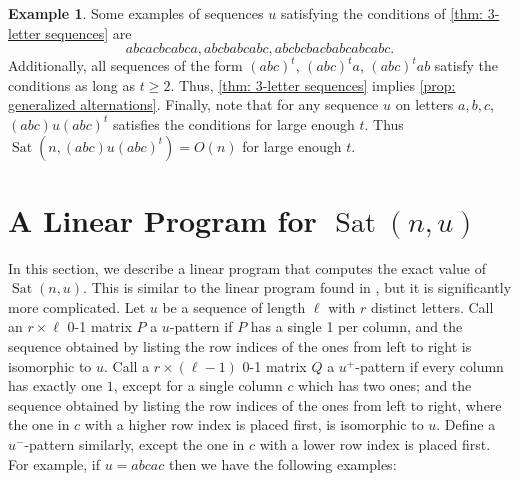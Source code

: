 \documentclass[12pt]{amsart}
\DeclareMathOperator{\Sat}{Sat}
\theoremstyle{definition}
\newtheorem{exam}{Example}
\numberwithin{equation}{section}
\numberwithin{table}{thm}
\begin{document}
\begin{exam}
Some examples of sequences $u$ satisfying the conditions of \cref{thm: 3-letter sequences} are
\[abcacbcabca, abcbabcabc,abcbcbacbabcabcabc.\]
Additionally, all sequences of the form $(abc)^t$, $(abc)^ta$, $(abc)^tab$ satisfy the conditions as long as $t\ge 2$. Thus, \cref{thm: 3-letter sequences} implies \cref{prop: generalized alternations}. Finally, note that for any sequence $u$ on letters $a,b,c$, $(abc)u(abc)^t$ satisfies the conditions for large enough $t$. Thus $\Sat(n,(abc)u(abc)^t)=O(n)$ for large enough $t$.
\end{exam}
\section{A Linear Program for \texorpdfstring{$\Sat(n,u)$}{Sat(n,u)}}\label{sec: linear program}

In this section, we describe a linear program that computes the exact value of $\Sat(n,u)$. This is similar to the linear program found in \cite{brahms01matrices}, but it is significantly more complicated. Let $u$ be a sequence of length $\ell$ with $r$ distinct letters. Call an $r \times \ell$ 0-1 matrix $P$ a $u$-pattern if $P$ has a single 1 per column, and the sequence obtained by listing the row indices of the ones from left to right is isomorphic to $u$. Call a $r\times (\ell-1)$ 0-1 matrix $Q$ a $u^+$-pattern if every column has exactly one $1$, except for a single column $c$ which has two ones; and the sequence obtained by listing the row indices of the ones from left to right, where the one in $c$ with a higher row index is placed first, is isomorphic to $u$. Define a $u^-$-pattern similarly, except the one in $c$ with a lower row index is placed first. For example, if $u=abcac$ then we have the following examples:\\
\end{document}
